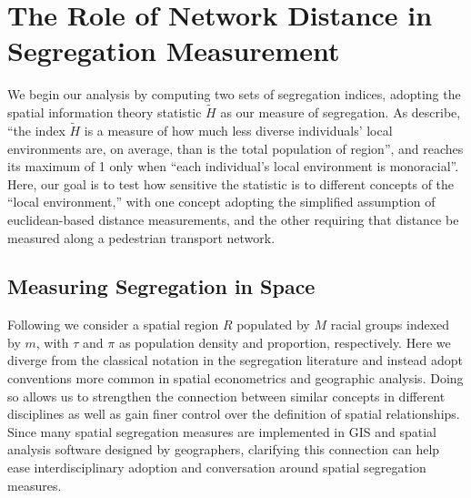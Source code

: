 \documentclass[
  10pt,
]{article}
\begin{document}
\hypertarget{the-role-of-network-distance-in-segregation-measurement}{%
\section{The Role of Network Distance in Segregation
Measurement}\label{the-role-of-network-distance-in-segregation-measurement}}

We begin our analysis by computing two sets of segregation indices,
adopting the spatial information theory statistic \(\tilde{H}\) as our
measure of segregation. As \citet[p.~512]{reardon2008GeographicScale}
describe, ``the index \(\tilde{H}\) is a measure of how much less
diverse individuals' local environments are, on average, than is the
total population of region'', and reaches its maximum of 1 only when
``each individual's local environment is monoracial''. Here, our goal is
to test how sensitive the statistic is to different concepts of the
``local environment,'' with one concept adopting the simplified
assumption of euclidean-based distance measurements, and the other
requiring that distance be measured along a pedestrian transport
network.

\hypertarget{measuring-segregation-in-space}{%
\subsection{Measuring Segregation in
Space}\label{measuring-segregation-in-space}}

Following \citet{reardon2004MeasuresSpatial} we consider a spatial
region \(R\) populated by \(M\) racial groups indexed by \(m\), with
\(\tau\) and \(\pi\) as population density and proportion, respectively.
Here we diverge from the classical notation in the segregation
literature and instead adopt conventions more common in spatial
econometrics and geographic analysis. Doing so allows us to strengthen
the connection between similar concepts in different disciplines as well
as gain finer control over the definition of spatial relationships.
Since many spatial segregation measures are implemented in GIS and
spatial analysis software designed by geographers, clarifying this
connection can help ease interdisciplinary adoption and conversation
around spatial segregation measures.
\end{document}
